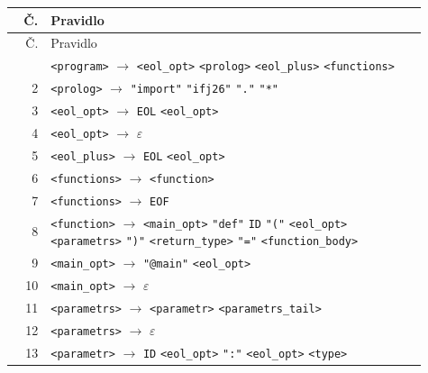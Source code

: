\documentclass[11pt,a4paper]{article}
\begin{document}
\begingroup
\small
\setlength{\tabcolsep}{2pt}
\renewcommand{\arraystretch}{1.03}
\begin{longtable}{@{}r@{\quad}>{\raggedright\arraybackslash}p{0.91\linewidth}@{}}
\hline Č. & Pravidlo \\ \hline
\endfirsthead
\hline Č. & Pravidlo \\ \hline
\endhead
\hline\endfoot
1 & \texttt{\textless{}program\textgreater{}} $\rightarrow$ \texttt{\textless{}eol\_opt\textgreater{}} \texttt{\textless{}prolog\textgreater{}} \texttt{\textless{}eol\_plus\textgreater{}} \texttt{\textless{}functions\textgreater{}} \\
2 & \texttt{\textless{}prolog\textgreater{}} $\rightarrow$ \texttt{"import"} \texttt{"ifj26"} \texttt{"."} \texttt{"*"} \\
3 & \texttt{\textless{}eol\_opt\textgreater{}} $\rightarrow$ \texttt{EOL} \texttt{\textless{}eol\_opt\textgreater{}} \\
4 & \texttt{\textless{}eol\_opt\textgreater{}} $\rightarrow$ $\varepsilon$ \\
5 & \texttt{\textless{}eol\_plus\textgreater{}} $\rightarrow$ \texttt{EOL} \texttt{\textless{}eol\_opt\textgreater{}} \\
6 & \texttt{\textless{}functions\textgreater{}} $\rightarrow$ \texttt{\textless{}function\textgreater{}} \\
7 & \texttt{\textless{}functions\textgreater{}} $\rightarrow$ \texttt{EOF} \\
8 & \texttt{\textless{}function\textgreater{}} $\rightarrow$ \texttt{\textless{}main\_opt\textgreater{}} \texttt{"def"} \texttt{ID} \texttt{"("} \texttt{\textless{}eol\_opt\textgreater{}} \texttt{\textless{}parametrs\textgreater{}} \texttt{")"} \texttt{\textless{}return\_type\textgreater{}} \texttt{"="} \texttt{\textless{}function\_body\textgreater{}} \\
9 & \texttt{\textless{}main\_opt\textgreater{}} $\rightarrow$ \texttt{"@main"} \texttt{\textless{}eol\_opt\textgreater{}} \\
10 & \texttt{\textless{}main\_opt\textgreater{}} $\rightarrow$ $\varepsilon$ \\
11 & \texttt{\textless{}parametrs\textgreater{}} $\rightarrow$ \texttt{\textless{}parametr\textgreater{}} \texttt{\textless{}parametrs\_tail\textgreater{}} \\
12 & \texttt{\textless{}parametrs\textgreater{}} $\rightarrow$ $\varepsilon$ \\
13 & \texttt{\textless{}parametr\textgreater{}} $\rightarrow$ \texttt{ID} \texttt{\textless{}eol\_opt\textgreater{}} \texttt{":"} \texttt{\textless{}eol\_opt\textgreater{}} \texttt{\textless{}type\textgreater{}} \\

\end{longtable}
\end{document}
